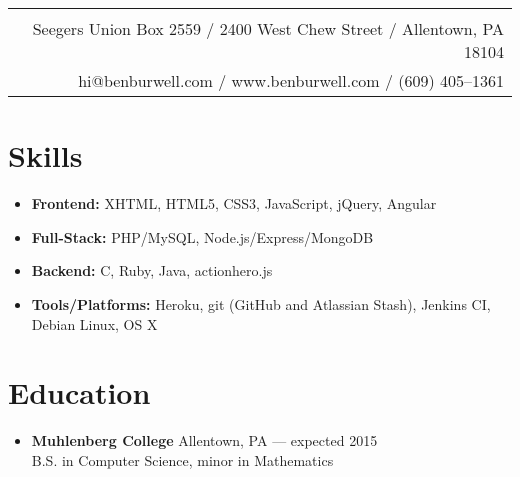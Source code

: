 \documentclass[11pt]{article}
\begin{document}
\thispagestyle{empty}

\noindent\begin{tabularx}{\textwidth}{|N|}
   \\
  Seegers Union Box 2559 / 2400 West Chew Street / Allentown, PA 18104 \\
  hi@benburwell.com / www.benburwell.com / (609) 405--1361 \\
  \hline
\end{tabularx}

\section*{Skills}
\begin{itemize}
  \item \textbf{Frontend:} XHTML, HTML5, CSS3, JavaScript, jQuery, Angular
  \item \textbf{Full-Stack:} PHP/MySQL, Node.js/Express/MongoDB
  \item \textbf{Backend:} C, Ruby, Java, actionhero.js
  \item \textbf{Tools/Platforms:} Heroku, git (GitHub and Atlassian Stash), Jenkins CI, Debian Linux, OS X
\end{itemize}

\section*{Education}
\begin{itemize}
  \item \textbf{Muhlenberg College} Allentown, PA --- expected 2015 \\
    B.S. in Computer Science, minor in Mathematics 
\end{itemize}
\end{document}
